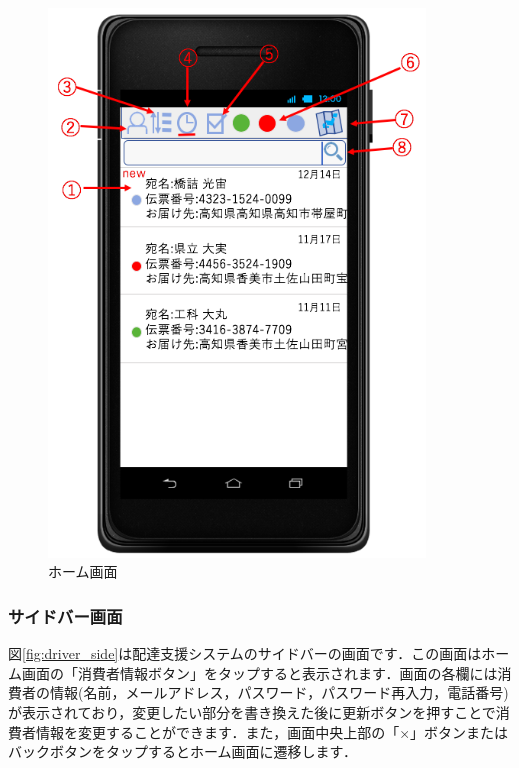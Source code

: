 \documentclass[a4j,titlepage]{jarticle}
\begin{document}
\begin{figure}[H]
 \begin{center}
  \includegraphics[width=100mm]{driver_home.png}
	\caption{ホーム画面}
	\label{fig:driver_home}
 \end{center}

\end{figure}



\newpage
\subsubsection{サイドバー画面}
図\ref{fig:driver_side}は配達支援システムのサイドバーの画面です．この画面はホーム画面の「消費者情報ボタン」をタップすると表示されます．画面の各欄には消費者の情報(名前，メールアドレス，パスワード，パスワード再入力，電話番号)が表示されており，変更したい部分を書き換えた後に更新ボタンを押すことで消費者情報を変更することができます．また，画面中央上部の「×」ボタンまたはバックボタンをタップするとホーム画面に遷移します．
\end{document}
